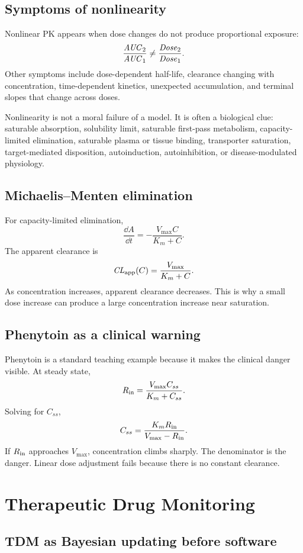 \documentclass[a4paper]{article}
\newcommand{\pkCL}{\pksym{CL}}
\newcommand{\pkAUC}{\pksym{AUC}}
\newcommand{\pkKm}{K_m}
\newcommand{\pkVmax}{V_{\max}}
\begin{document}
\subsection{Symptoms of nonlinearity}

Nonlinear PK appears when dose changes do not produce proportional exposure:
\[
  \frac{\pkAUC_2}{\pkAUC_1}\ne
  \frac{\pksym{Dose}_2}{\pksym{Dose}_1}.
\]
Other symptoms include dose-dependent half-life, clearance changing with concentration, time-dependent kinetics, unexpected accumulation, and terminal slopes that change across doses.

Nonlinearity is not a moral failure of a model. It is often a biological clue: saturable absorption, solubility limit, saturable first-pass metabolism, capacity-limited elimination, saturable plasma or tissue binding, transporter saturation, target-mediated disposition, autoinduction, autoinhibition, or disease-modulated physiology.

\subsection{Michaelis--Menten elimination}

For capacity-limited elimination,
\[
  \frac{\dd A}{\dd t}
  =
  -\frac{\pkVmax C}{\pkKm+C}.
\]
The apparent clearance is
\[
  \pkCL_{\pklab{app}}(C)=\frac{\pkVmax}{\pkKm+C}.
\]
As concentration increases, apparent clearance decreases. This is why a small dose increase can produce a large concentration increase near saturation.

\subsection{Phenytoin as a clinical warning}

Phenytoin is a standard teaching example because it makes the clinical danger visible. At steady state,
\[
  R_{\pklab{in}}=\frac{\pkVmax C_{ss}}{\pkKm+C_{ss}}.
\]
Solving for \(C_{ss}\),
\[
  C_{ss}
  =
  \frac{\pkKm R_{\pklab{in}}}{\pkVmax-R_{\pklab{in}}}.
\]
If \(R_{\mathrm{in}}\) approaches \(\pkVmax\), concentration climbs sharply. The denominator is the danger. Linear dose adjustment fails because there is no constant clearance.

\section{Therapeutic Drug Monitoring}

\subsection{TDM as Bayesian updating before software}
\end{document}
